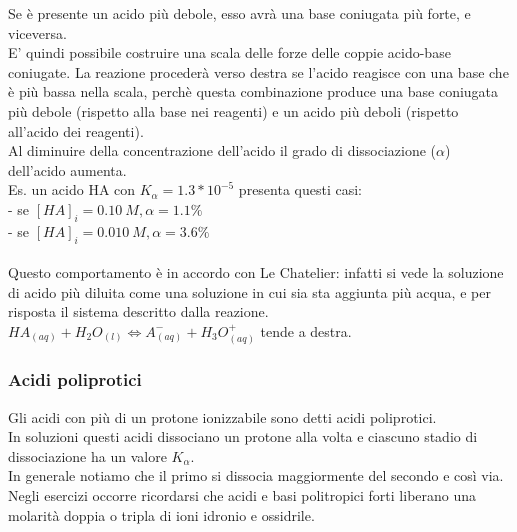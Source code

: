 Se è presente un acido più debole, esso avrà una base coniugata più forte, e viceversa.\\
E' quindi possibile costruire una scala delle forze delle coppie acido-base coniugate. La reazione procederà verso destra se l'acido reagisce con una base che è più bassa nella scala, perchè questa combinazione produce una base coniugata più debole (rispetto alla base nei reagenti) e un acido più deboli (rispetto all'acido dei reagenti).\\
Al diminuire della concentrazione dell'acido il grado di dissociazione ($\alpha$) dell'acido aumenta.\\
Es. un acido HA con $K_{\alpha} = 1.3*10^{-5}$ presenta questi casi:\\
\tab- se $[HA]_i = 0.10\ M, \alpha = 1.1\%$\\
\tab- se $[HA]_i = 0.010\ M, \alpha = 3.6\%$\\\\
Questo comportamento è in accordo con Le Chatelier: infatti si vede la soluzione di acido più diluita come una soluzione in cui sia sta aggiunta più acqua, e per risposta il sistema descritto dalla reazione.\\
$HA_{(aq)} + H_2O_{(l)} \Leftrightarrow A^-_{(aq)} + H_3O^+_{(aq)}$ tende a destra.\\
\subsubsection{Acidi poliprotici}
Gli acidi con più di un protone ionizzabile sono detti acidi poliprotici.\\
In soluzioni questi acidi dissociano un protone alla volta e ciascuno stadio di dissociazione ha un valore $K_{\alpha}$.\\
In generale notiamo che il primo si dissocia maggiormente del secondo e così via.\\
Negli esercizi occorre ricordarsi che acidi e basi politropici forti liberano una molarità doppia o tripla di ioni idronio e ossidrile.
